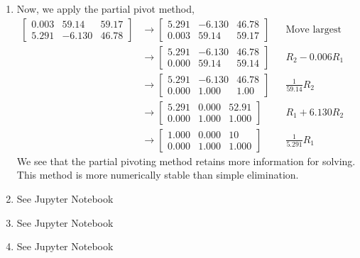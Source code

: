 \documentclass[letterpaper,10pt]{article}
\begin{document}
\begin{enumerate}
\begin{align*}
\begin{array}{cc|c}
1.000 & 0.000 & -10\\ 0.000 & 1 & 1.001
\end{array}\right] && R_1-19710R_2\\
\end{align*}
We see that the result is then $[-10, 1.001]^T$. The four digit arithmetic without pivots leads to dramatically incorrect results.
\item Now, we apply the partial pivot method,
\begin{align*}
\left[\begin{array}{cc|c}
0.003 & 59.14 & 59.17\\ 5.291 & -6.130 & 46.78
\end{array}\right] &\to \left[\begin{array}{cc|c}
5.291 & -6.130 & 46.78\\0.003 & 59.14 & 59.17
\end{array}\right] && \text{Move largest value to R1}\\
&\to \left[\begin{array}{cc|c}
5.291 & -6.130 & 46.78\\0.000 & 59.14 & 59.14
\end{array}\right] && R_2-0.006R_1\\
&\to \left[\begin{array}{cc|c}
5.291 & -6.130 & 46.78\\0.000 & 1.000 & 1.00
\end{array}\right] && \frac{1}{59.14}R_2\\
&\to \left[\begin{array}{cc|c}
5.291 & 0.000 & 52.91\\0.000 & 1.000 & 1.000
\end{array}\right] && R_1+6.130R_2\\
&\to \left[\begin{array}{cc|c}
1.000 & 0.000 & 10\\0.000 & 1.000 & 1.000
\end{array}\right] && \frac{1}{5.291}R_1
\end{align*}
We see that the partial pivoting method retains more information for solving. This method is more numerically stable than simple elimination.
\item See Jupyter Notebook
\item See Jupyter Notebook
\item See Jupyter Notebook
\end{enumerate}
\end{document}
